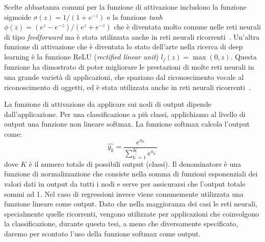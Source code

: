 Scelte abbastanza comuni per la funzione di attivazione includono la funzione sigmoide $\sigma(z) = 1/(1+e^{-z})$ e la funzione \emph{tanh} $\phi(z)=(e^z-e^{-z})/(e^z+e^{-z})$ che \`e diventata molto comune nelle reti neurali di tipo \emph{feedforward} ma \`e stata utilizzata anche in reti neurali ricorrenti~\cite{Sutskever:2011}.
Un'altra funzione di attivazione che \`e diventata lo stato dell'arte nella ricerca di deep learning \`e la funzione ReLU (\emph{rectified linear unit}) $l_j(z)=\operatorname{max}(0, z)$.
Questa funzione ha dimostrato di poter migliorare le prestazioni di molte reti neurali in una grande variet\`a di applicazioni, che spaziano dal riconoscimento vocale al riconoscimento di oggetti, ed \`e stata utilizzata anche in reti neurali ricorrenti~\cite{Bengio:2013}.

La funzione di attivazione da applicare sui nodi di output dipende dall'applicazione.
Per una classificazione a pi\`u classi, applichiamo al livello di output una funzione non lineare softmax.
La funzione softmax calcola l'output come:
\begin{equation}
  \hat{y_k} = \frac{e^{a_k}}{\sum_{k^{'}=1}^{K} e^{a_{k^{'}}}}
\end{equation}
dove $K$ \`e il numero totale di possibili output (classi). Il denominatore \`e una funzione di normalizzazione che consiste nella somma di funzioni esponenziali dei valori dati in output da tutti i nodi e serve per assicurarsi che l'output totale sommi ad 1.
Nel caso di regressioni invece viene comunemente utilizzata una funzione lineare come output.
Dato che nella maggioranza dei casi le reti neurali, specialmente quelle ricorrenti, vengono utilizzate per applicazioni che coinvolgono la classificazione, durante questa tesi, a meno che diversamente specificato, daremo per scontato l'uso della funzione softmax come output.

